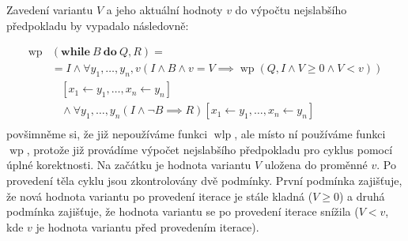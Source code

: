 Zavedení variantu $V$ a jeho aktuální hodnoty $v$ do výpočtu nejslabšího předpokladu by vypadalo následovně:

\begin{align*}
    \operatorname{wp}&(\textbf{while} \ B \ \textbf{do} \ Q, R) = \\
        & = I \land \forall y_1,\ldots,y_n,v \left( I \land B \land v = V \implies \operatorname{wp}(Q, I \land V \geq 0 \land V < v) \right) \\
        & \ \ \ \ [x_1 \leftarrow y_1, \ldots, x_n \leftarrow y_n] \\
        & \ \ \ \ \land \forall y_1,\ldots,y_n \left( I \land \neg B \implies R \right)[x_1 \leftarrow y_1, \ldots, x_n \leftarrow y_n] \\
\end{align*}
povšimněme si, že již nepoužíváme funkci $\operatorname{wlp}$, ale místo ní používáme funkci $\operatorname{wp}$,
protože již provádíme výpočet nejslabšího předpokladu pro cyklus pomocí úplné korektnosti.
Na začátku je hodnota variantu $V$ uložena do proměnné $v$.
Po provedení těla cyklu jsou zkontrolovány dvě podmínky.
První podmínka zajišťuje, že nová hodnota variantu po provedení iterace je stále kladná ($V \geq 0$)
a druhá podmínka zajišťuje, že hodnota variantu se po provedení iterace snížila ($V < v$, kde $v$ je hodnota variantu před provedením iterace).

